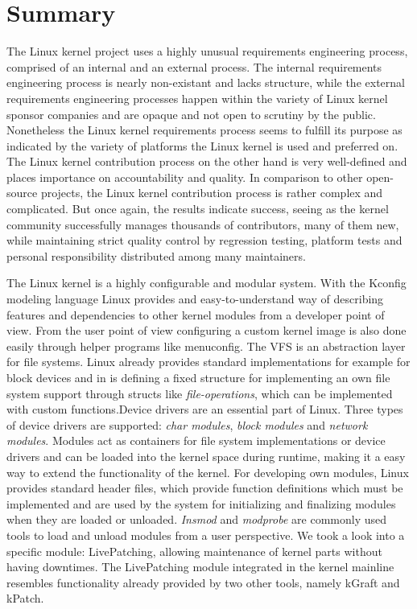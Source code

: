 \documentclass{sig-alternate-05-2015}
\begin{document}
\section{Summary}
The Linux kernel project uses a highly unusual requirements engineering process, comprised of an internal and an external process.
The internal requirements engineering process is nearly non-existant and lacks structure, while the external requirements engineering processes happen within the variety of Linux kernel sponsor companies and are opaque and not open to scrutiny by the public.
Nonetheless the Linux kernel requirements process seems to fulfill its purpose as indicated by the variety of platforms the Linux kernel is used and preferred on.
The Linux kernel contribution process on the other hand is very well-defined and places importance on accountability and quality.
In comparison to other open-source projects, the Linux kernel contribution process is rather complex and complicated.
But once again, the results indicate success, seeing as the kernel community successfully manages thousands of contributors, many of them new, while maintaining strict quality control by regression testing, platform tests and personal responsibility distributed among many maintainers.

The Linux kernel is a highly configurable and modular system. With the Kconfig modeling language Linux provides and easy-to-understand way of describing features and dependencies to other kernel modules from a developer point of view. From the user point of view configuring a custom kernel image is also done easily through helper programs like menuconfig. The VFS is an abstraction layer for file systems. Linux already provides standard implementations  for example for block devices and in is defining a fixed structure for implementing an own file system support through structs like \emph{file-operations}, which can be implemented with custom functions.Device drivers are an essential part of Linux. Three types of device drivers are supported: \emph{char modules}, \emph{block modules} and \emph{network modules}. Modules act as containers for file system implementations or device drivers and can be loaded into the kernel space during runtime, making it a easy way to extend the functionality of the kernel. For developing own modules, Linux provides standard header files, which provide function definitions which must be implemented and are used by the system for initializing and finalizing modules when they are loaded or unloaded. \emph{Insmod} and \emph{modprobe} are commonly used tools to load and unload modules from a user perspective. We took a look into a specific module: LivePatching, allowing maintenance of kernel parts without having downtimes. The  LivePatching module integrated in the kernel mainline resembles functionality already provided by two other tools, namely kGraft and kPatch. \\








\balancecolumns{}
\end{document}
